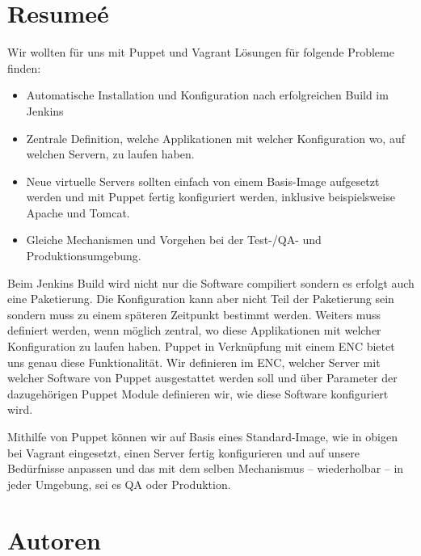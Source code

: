 \documentclass[12pt,a4paper,ngerman]{article}
\begin{document}
\section{Resumeé}

Wir wollten für uns mit Puppet und Vagrant Lösungen für folgende Probleme finden:
\begin{itemize}
\item Automatische Installation und Konfiguration nach erfolgreichen Build im Jenkins 
\item Zentrale Definition, welche Applikationen mit welcher Konfiguration wo, auf welchen Servern, zu laufen haben.
\item Neue virtuelle Servers sollten einfach von einem Basis-Image aufgesetzt werden und mit Puppet fertig konfiguriert werden, inklusive beispielsweise Apache und Tomcat.
\item Gleiche Mechanismen und Vorgehen bei der Test-/QA- und Produktionsumgebung.
\end{itemize}

Beim Jenkins Build wird nicht nur die Software compiliert sondern es erfolgt auch eine Paketierung.  Die Konfiguration kann aber nicht Teil der Paketierung sein sondern muss zu einem späteren Zeitpunkt bestimmt werden. Weiters muss definiert werden, wenn möglich zentral, wo diese Applikationen mit welcher Konfiguration zu laufen haben. Puppet in Verknüpfung mit einem ENC bietet uns genau diese Funktionalität. Wir definieren im ENC, welcher Server mit welcher Software von Puppet ausgestattet werden soll und über Parameter der dazugehörigen Puppet Module definieren wir, wie diese Software konfiguriert wird. 

Mithilfe von Puppet können wir auf Basis eines Standard-Image, wie in obigen bei Vagrant eingesetzt, einen Server fertig konfigurieren und auf unsere Bedürfnisse anpassen und das mit dem selben Mechanismus -- wiederholbar -- in jeder Umgebung, sei es QA oder Produktion.


\section*{Autoren}
\end{document}
